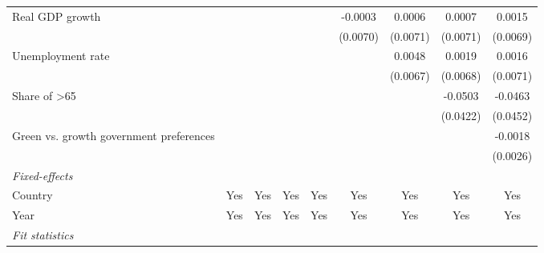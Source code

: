 \begin{table}[htbp]
\begin{tabular}{lcccccccc}
      Real GDP growth                                                                   &          &          &                &                & -0.0003        & 0.0006         & 0.0007         & 0.0015\\   
                                                                                        &          &          &                &                & (0.0070)       & (0.0071)       & (0.0071)       & (0.0069)\\   
      Unemployment rate                                                                 &          &          &                &                &                & 0.0048         & 0.0019         & 0.0016\\   
                                                                                        &          &          &                &                &                & (0.0067)       & (0.0068)       & (0.0071)\\   
      Share of >65                                                                      &          &          &                &                &                &                & -0.0503        & -0.0463\\   
                                                                                        &          &          &                &                &                &                & (0.0422)       & (0.0452)\\   
      Green vs. growth government preferences                                           &          &          &                &                &                &                &                & -0.0018\\   
                                                                                        &          &          &                &                &                &                &                & (0.0026)\\   
      \midrule
      \emph{Fixed-effects}\\
      Country                                                                           & Yes      & Yes      & Yes            & Yes            & Yes            & Yes            & Yes            & Yes\\  
      Year                                                                              & Yes      & Yes      & Yes            & Yes            & Yes            & Yes            & Yes            & Yes\\  
      \midrule
      \emph{Fit statistics}\\

\end{tabular}
\end{table}
